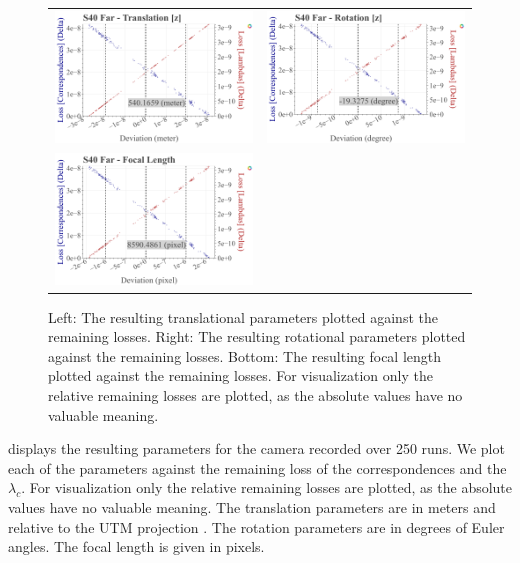 \begin{figure}[t]
\begin{tabular}{cc}
    \includegraphics[width=0.45 \linewidth]{diagrams/calibration/s40_n_far/parameters.csv/Translation[z]_vs_Loss[Correspondences]_vs_Loss[Lambdas]_cluster_All.png} &
    \includegraphics[width=0.45 \linewidth]{diagrams/calibration/s40_n_far/parameters.csv/Rotation[z]_vs_Loss[Correspondences]_vs_Loss[Lambdas]_cluster_All.png} \\

    \includegraphics[width=0.45 \linewidth]{diagrams/calibration/s40_n_far/parameters.csv/FocalLength_vs_Loss[Correspondences]_vs_Loss[Lambdas]_cluster_All.png} \\
\end{tabular}
\caption{
  Left: The resulting translational parameters plotted against the remaining losses. 
  Right: The resulting rotational parameters plotted against the remaining losses.
  Bottom: The resulting focal length  plotted against the remaining losses.
  For visualization only the relative remaining losses are plotted, as the absolute values have no valuable meaning.
  }
\label{fig:static_calibration_algorithmic_error}
\end{figure}

 displays the resulting parameters for the camera  recorded over 250 runs.
We plot each of the parameters against the remaining loss of the correspondences and the $\lambda_c$. 
For visualization only the relative remaining losses are plotted, as the absolute values have no valuable meaning.
The translation parameters are in meters and relative to the UTM projection \cite{langley1998utm}.
The rotation parameters are in degrees of Euler angles. The focal length is given in pixels.


